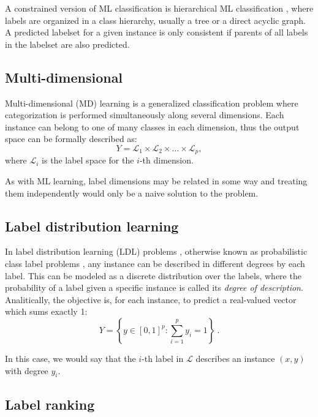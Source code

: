   A constrained version of ML classification is hierarchical ML classification , where labels are organized in a class hierarchy, usually a tree or a direct acyclic graph. A predicted labelset for a given instance is only consistent if parents of all labels in the labelset are also predicted.
  

\subsection{Multi-dimensional}
\label{p3sec:mdim}

Multi-dimensional (MD) learning  is a generalized classification problem where categorization is performed simultaneously along several dimensions. Each instance can belong to one of many classes in each dimension, thus the output space can be formally described as:
\begin{equation}
  Y=\mathcal L_1\times\mathcal L_2\times\dots\times\mathcal L_p,
  \end{equation}
where $\mathcal L_i$ is the label space for the $i$-th dimension. 

As with ML learning, label dimensions may be related in some way and treating them independently would only be a naive solution to the problem.

\subsection{Label distribution learning}
\label{p3sec:ldl}

In label distribution learning (LDL) problems , otherwise known as probabilistic class label problems , any instance can be described in different degrees by each label. This can be modeled as a discrete distribution over the labels, where the probability of a label given a specific instance is called its \emph{degree of description}. Analitically, the objective is, for each instance, to predict a real-valued vector which sums exactly 1:
\begin{equation}
  Y=\left\{y\in\left[0,1\right]^p:\sum_{i=1}^p y_i = 1\right\}~.
  \end{equation}
  
In this case, we would say that the $i$-th label in $\mathcal L$ describes an instance $(x, y)$ with degree $y_i$.

\subsection{Label ranking}


